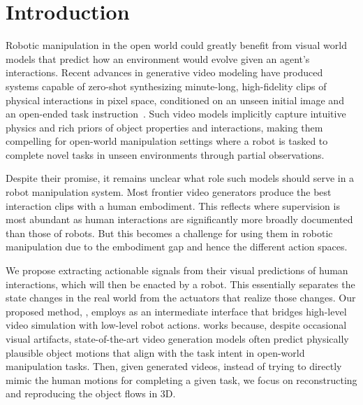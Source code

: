 \section{Introduction}
\begingroup
  \setlength{\skip\footins}{0pt}    
  \setlength{\footnotesep}{0pt}     
  \let\thefootnote\relax
  \begin{NoHyper}
  \end{NoHyper}
\endgroup
Robotic manipulation in the open world could greatly benefit from visual world models that predict how an environment would evolve given an agent's interactions.
Recent advances in generative video modeling have produced systems capable of zero-shot synthesizing minute-long, high-fidelity clips of physical interactions in pixel space, conditioned on an unseen initial image and an open-ended task instruction~\cite{brooks2024video}.
Such video models implicitly capture intuitive physics and rich priors of object properties and interactions, making them compelling for open-world manipulation settings where a robot is tasked to complete novel tasks in unseen environments through partial observations.

Despite their promise, it remains unclear what role such models should serve in a robot manipulation system. 
Most frontier video generators produce the best interaction clips with a human embodiment. This reflects where supervision is most abundant as human interactions are significantly more broadly documented than those of robots. But this becomes a challenge for using them in robotic manipulation due to the embodiment gap and hence the different action spaces.

We propose extracting actionable signals from their visual predictions of human interactions, which will then be enacted by a robot. 
This essentially separates the state changes in the real world from the actuators that realize those changes. 
Our proposed method, \textbf{\algo}, employs \textbf{\flow} as an intermediate interface that bridges high-level video simulation with low-level robot actions.
\algo works because, despite occasional visual artifacts, state-of-the-art video generation models often predict physically plausible object motions that align with the task intent in open-world manipulation tasks.
Then, given generated videos, instead of trying to directly mimic the human motions for completing a given task, we focus on reconstructing and reproducing the object flows in 3D.

